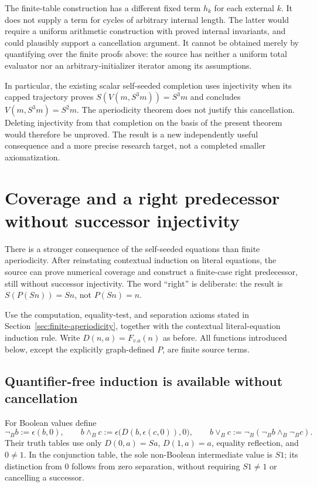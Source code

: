 \documentclass[11pt,letterpaper]{article}
\theoremstyle{definition}\newtheorem{definition}[theorem]{Definition}
\theoremstyle{remark}\newtheorem{remark}[theorem]{Remark}
\begin{document}
The finite-table construction has a different fixed term $h_k$ for each
external $k$. It does not supply a term for cycles of arbitrary internal
length. The latter would require a uniform arithmetic construction with
proved internal invariants, and could plausibly support a cancellation
argument. It cannot be obtained merely by quantifying over the finite
proofs above: the source has neither a uniform total evaluator nor an
arbitrary-initializer iterator among its assumptions.

In particular, the existing scalar self-seeded completion uses injectivity
when its capped trajectory proves
$S(V(m,S^3m))=S^3m$ and concludes $V(m,S^3m)=S^2m$. The aperiodicity
theorem does not justify this cancellation. Deleting injectivity from that
completion on the basis of the present theorem would therefore be
unproved. The result is a new independently useful consequence and a
more precise research target, not a completed smaller axiomatization.

\section{Coverage and a right predecessor without successor injectivity}
\label{sec:right-predecessor}

There is a stronger consequence of the self-seeded equations than finite
aperiodicity. After reinstating contextual induction on literal equations,
the source can prove numerical coverage and construct a finite-case
right predecessor, still without successor injectivity. The word
``right'' is deliberate: the result is $S(P(Sn))=Sn$, not $P(Sn)=n$.

Use the computation, equality-test, and separation axioms stated in
Section~\ref{sec:finite-aperiodicity}, together with the contextual
literal-equation induction rule. Write $D(n,a)=F_{v.a}(n)$ as before.
All functions introduced below, except the explicitly graph-defined $P$,
are finite source terms.

\subsection{Quantifier-free induction is available without cancellation}

For Boolean values define
\[
 \neg_B b:=\epsilon(b,0),\qquad
 b\land_B c:=\epsilon\bigl(D(b,\epsilon(c,0)),0\bigr),\qquad
 b\lor_B c:=\neg_B(\neg_B b\land_B\neg_B c).
\]
Their truth tables use only $D(0,a)=Sa$, $D(1,a)=a$, equality reflection,
and $0\ne1$. In the conjunction table, the sole non-Boolean intermediate
value is $S1$; its distinction from $0$ follows from zero separation,
without requiring $S1\ne1$ or cancelling a successor.
\end{document}
